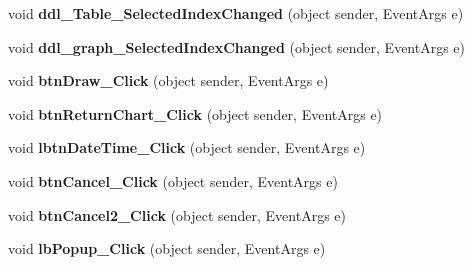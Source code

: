 \begin{DoxyCompactItemize}
\item 
\hypertarget{classusertrackmyhealth__stress_a84dda70444c7565d068b2e1c01434159}{void {\bfseries ddl\-\_\-\-Table\-\_\-\-Selected\-Index\-Changed} (object sender, Event\-Args e)}\label{classusertrackmyhealth__stress_a84dda70444c7565d068b2e1c01434159}

\item 
\hypertarget{classusertrackmyhealth__stress_a8660bc5ea5f2d62401ba8924d0852336}{void {\bfseries ddl\-\_\-graph\-\_\-\-Selected\-Index\-Changed} (object sender, Event\-Args e)}\label{classusertrackmyhealth__stress_a8660bc5ea5f2d62401ba8924d0852336}

\item 
\hypertarget{classusertrackmyhealth__stress_a904c7db8bf5b2c39de36fd7a4b838a8a}{void {\bfseries btn\-Draw\-\_\-\-Click} (object sender, Event\-Args e)}\label{classusertrackmyhealth__stress_a904c7db8bf5b2c39de36fd7a4b838a8a}

\item 
\hypertarget{classusertrackmyhealth__stress_a842123f9096a18248b55736fcac7a54e}{void {\bfseries btn\-Return\-Chart\-\_\-\-Click} (object sender, Event\-Args e)}\label{classusertrackmyhealth__stress_a842123f9096a18248b55736fcac7a54e}

\item 
\hypertarget{classusertrackmyhealth__stress_a725c720859d0eaf86d2e2cb0a3469c2c}{void {\bfseries lbtn\-Date\-Time\-\_\-\-Click} (object sender, Event\-Args e)}\label{classusertrackmyhealth__stress_a725c720859d0eaf86d2e2cb0a3469c2c}

\item 
\hypertarget{classusertrackmyhealth__stress_ae63d4ee200f3df0263c033d4694300a3}{void {\bfseries btn\-Cancel\-\_\-\-Click} (object sender, Event\-Args e)}\label{classusertrackmyhealth__stress_ae63d4ee200f3df0263c033d4694300a3}

\item 
\hypertarget{classusertrackmyhealth__stress_ac9f7cb07b3d9421d0f7ecd2fc8edf3ac}{void {\bfseries btn\-Cancel2\-\_\-\-Click} (object sender, Event\-Args e)}\label{classusertrackmyhealth__stress_ac9f7cb07b3d9421d0f7ecd2fc8edf3ac}

\item 
\hypertarget{classusertrackmyhealth__stress_ab00cbdc6dcfdb446cabff178b23668c1}{void {\bfseries lb\-Popup\-\_\-\-Click} (object sender, Event\-Args e)}\label{classusertrackmyhealth__stress_ab00cbdc6dcfdb446cabff178b23668c1}

\end{DoxyCompactItemize}


